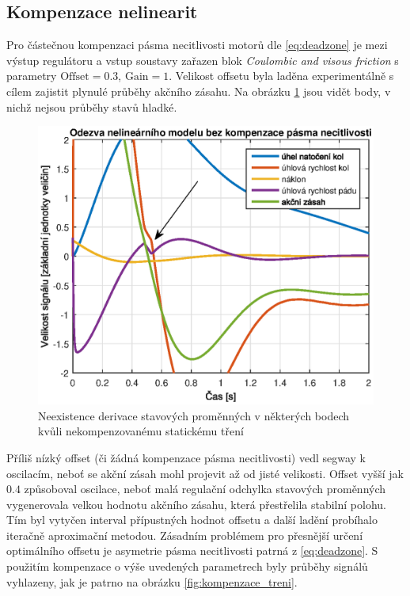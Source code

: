 \documentclass[conference]{IEEEtran}
\begin{document}
\subsection{Kompenzace nelinearit}
 Pro částečnou kompenzaci pásma necitlivosti motorů dle \eqref{eq:deadzone} je mezi výstup regulátoru a vstup soustavy
zařazen blok \textit{Coulombic and visous friction} s parametry $\text{Offset} = 0.3$, $\text{Gain} = 1$. Velikost offsetu byla laděna
experimentálně s cílem zajistit plynulé průběhy akčního zásahu. Na obrázku \ref{fig:bez_kompenzace_treni} jsou vidět body, v nichž nejsou průběhy stavů hladké.
\begin{figure}[htbp]
    \centerline{\includegraphics[width=\linewidth]{regulace_bez_kompenzace_treni.eps}}
    \caption{Neexistence derivace stavových proměnných v některých bodech kvůli nekompenzovanému statickému tření}
    \label{fig:bez_kompenzace_treni}        
\end{figure}
Příliš nízký offset (či žádná kompenzace pásma necitlivosti) vedl segway k oscilacím, neboť
se akční zásah mohl projevit až od jisté velikosti. Offset vyšší jak $0.4$ způsoboval oscilace, neboť malá regulační odchylka stavových proměnných
vygenerovala velkou hodnotu akčního zásahu, která přestřelila stabilní polohu.
Tím byl vytyčen interval přípustných hodnot offsetu a další ladění probíhalo iteračně aproximační metodou. 
Zásadním problémem pro přesnější určení optimálního offsetu je asymetrie pásma necitlivosti patrná z \eqref{eq:deadzone}.
S použitím kompenzace o výše uvedených parametrech byly průběhy signálů vyhlazeny, jak je patrno na obrázku \ref{fig:kompenzace_treni}. 
\end{document}
